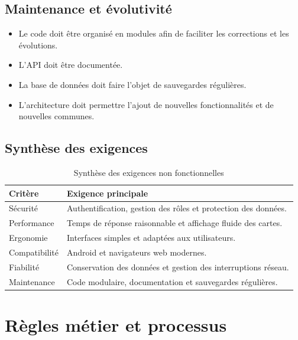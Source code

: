 \documentclass[11pt,a4paper,oneside]{report}
\begin{document}
	\subsection{Maintenance et évolutivité}
	
	\begin{itemize}
		\item Le code doit être organisé en modules afin de faciliter
		les corrections et les évolutions.
		\item L'API doit être documentée.
		\item La base de données doit faire l'objet de sauvegardes régulières.
		\item L'architecture doit permettre l'ajout de nouvelles
		fonctionnalités et de nouvelles communes.
	\end{itemize}
	
	\subsection{Synthèse des exigences}
	
	\begin{table}[H]
		\centering
		\small
		\renewcommand{\arraystretch}{1.2}
		\begin{tabular}{|p{3.2cm}|p{10.2cm}|}
			\hline
			\textbf{Critère} & \textbf{Exigence principale} \\
			\hline
			Sécurité & Authentification, gestion des rôles et protection des données. \\
			\hline
			Performance & Temps de réponse raisonnable et affichage fluide des cartes. \\
			\hline
			Ergonomie & Interfaces simples et adaptées aux utilisateurs. \\
			\hline
			Compatibilité & Android et navigateurs web modernes. \\
			\hline
			Fiabilité & Conservation des données et gestion des interruptions réseau. \\
			\hline
			Maintenance & Code modulaire, documentation et sauvegardes régulières. \\
			\hline
		\end{tabular}
		\caption{Synthèse des exigences non fonctionnelles}
	\end{table}
	
	
	\section{Règles métier et processus}
	
\end{document}
